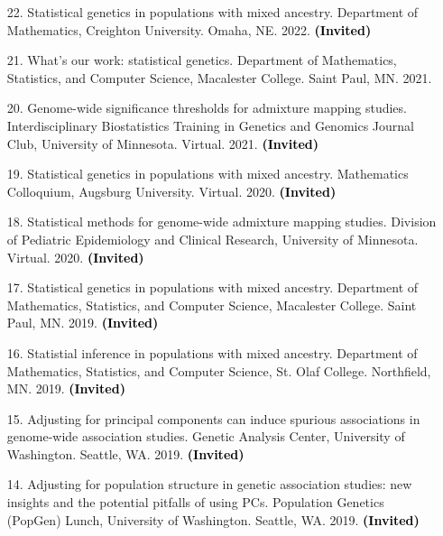 \documentclass[margin]{res}
\newcommand{\annotate}[1]{\textcolor{black}{\textbf{(#1)}}}
\begin{document}
\begin{resume}
\begin{itemize}
\item[22.] Statistical genetics in populations with mixed ancestry. 
Department of Mathematics, Creighton University. Omaha, NE. 2022. 
\annotate{Invited}

\item[21.] What's our work: statistical genetics. 
Department of Mathematics, Statistics, and Computer Science, Macalester College. Saint Paul, MN. 2021.

\item[20.] Genome-wide significance thresholds for admixture mapping studies.
Interdisciplinary Biostatistics Training in Genetics and Genomics Journal Club, University of Minnesota. Virtual. 2021. 
\annotate{Invited}

\item[19.] Statistical genetics in populations with mixed ancestry. 
Mathematics Colloquium, Augsburg University. Virtual. 2020. 
\annotate{Invited}

\item[18.] Statistical methods for genome-wide admixture mapping studies. 
Division of Pediatric Epidemiology and Clinical Research, University of Minnesota. Virtual. 2020. 
\annotate{Invited}

\item[17.] Statistical genetics in populations with mixed ancestry. 
Department of Mathematics, Statistics, and Computer Science, Macalester College. Saint Paul, MN. 2019. 
\annotate{Invited}

\item[16.] Statistial inference in populations with mixed ancestry. 
Department of Mathematics, Statistics, and Computer Science, St. Olaf College. Northfield, MN. 2019. 
\annotate{Invited}

\item[15.] Adjusting for principal components can induce spurious associations in genome-wide association studies. 
Genetic Analysis Center, University of Washington. Seattle, WA. 2019. 
\annotate{Invited}

\item[14.] Adjusting for population structure in genetic association studies: new insights and the potential pitfalls of using PCs. 
Population Genetics (PopGen) Lunch, University of Washington. Seattle, WA. 2019.  
\annotate{Invited}



\end{itemize}
\end{resume}
\end{document}
